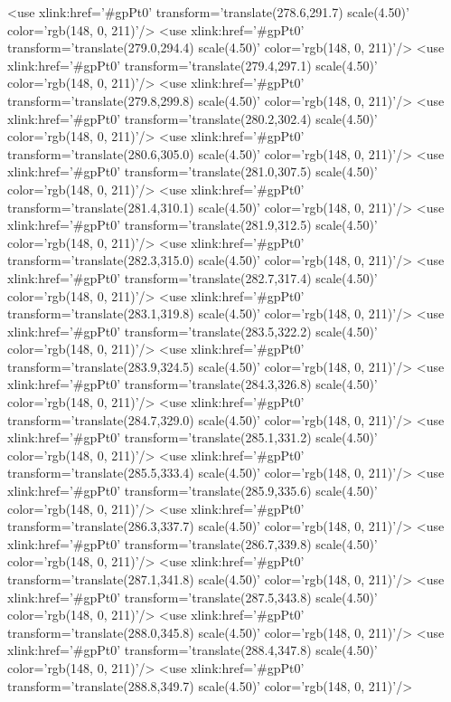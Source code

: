 	<use xlink:href='#gpPt0' transform='translate(278.6,291.7) scale(4.50)' color='rgb(148,   0, 211)'/>
	<use xlink:href='#gpPt0' transform='translate(279.0,294.4) scale(4.50)' color='rgb(148,   0, 211)'/>
	<use xlink:href='#gpPt0' transform='translate(279.4,297.1) scale(4.50)' color='rgb(148,   0, 211)'/>
	<use xlink:href='#gpPt0' transform='translate(279.8,299.8) scale(4.50)' color='rgb(148,   0, 211)'/>
	<use xlink:href='#gpPt0' transform='translate(280.2,302.4) scale(4.50)' color='rgb(148,   0, 211)'/>
	<use xlink:href='#gpPt0' transform='translate(280.6,305.0) scale(4.50)' color='rgb(148,   0, 211)'/>
	<use xlink:href='#gpPt0' transform='translate(281.0,307.5) scale(4.50)' color='rgb(148,   0, 211)'/>
	<use xlink:href='#gpPt0' transform='translate(281.4,310.1) scale(4.50)' color='rgb(148,   0, 211)'/>
	<use xlink:href='#gpPt0' transform='translate(281.9,312.5) scale(4.50)' color='rgb(148,   0, 211)'/>
	<use xlink:href='#gpPt0' transform='translate(282.3,315.0) scale(4.50)' color='rgb(148,   0, 211)'/>
	<use xlink:href='#gpPt0' transform='translate(282.7,317.4) scale(4.50)' color='rgb(148,   0, 211)'/>
	<use xlink:href='#gpPt0' transform='translate(283.1,319.8) scale(4.50)' color='rgb(148,   0, 211)'/>
	<use xlink:href='#gpPt0' transform='translate(283.5,322.2) scale(4.50)' color='rgb(148,   0, 211)'/>
	<use xlink:href='#gpPt0' transform='translate(283.9,324.5) scale(4.50)' color='rgb(148,   0, 211)'/>
	<use xlink:href='#gpPt0' transform='translate(284.3,326.8) scale(4.50)' color='rgb(148,   0, 211)'/>
	<use xlink:href='#gpPt0' transform='translate(284.7,329.0) scale(4.50)' color='rgb(148,   0, 211)'/>
	<use xlink:href='#gpPt0' transform='translate(285.1,331.2) scale(4.50)' color='rgb(148,   0, 211)'/>
	<use xlink:href='#gpPt0' transform='translate(285.5,333.4) scale(4.50)' color='rgb(148,   0, 211)'/>
	<use xlink:href='#gpPt0' transform='translate(285.9,335.6) scale(4.50)' color='rgb(148,   0, 211)'/>
	<use xlink:href='#gpPt0' transform='translate(286.3,337.7) scale(4.50)' color='rgb(148,   0, 211)'/>
	<use xlink:href='#gpPt0' transform='translate(286.7,339.8) scale(4.50)' color='rgb(148,   0, 211)'/>
	<use xlink:href='#gpPt0' transform='translate(287.1,341.8) scale(4.50)' color='rgb(148,   0, 211)'/>
	<use xlink:href='#gpPt0' transform='translate(287.5,343.8) scale(4.50)' color='rgb(148,   0, 211)'/>
	<use xlink:href='#gpPt0' transform='translate(288.0,345.8) scale(4.50)' color='rgb(148,   0, 211)'/>
	<use xlink:href='#gpPt0' transform='translate(288.4,347.8) scale(4.50)' color='rgb(148,   0, 211)'/>
	<use xlink:href='#gpPt0' transform='translate(288.8,349.7) scale(4.50)' color='rgb(148,   0, 211)'/>
